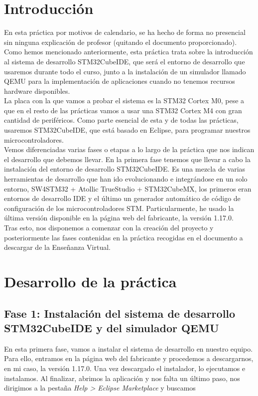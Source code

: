 \documentclass[11pt,a4paper]{article}
\begin{document}
	\section{Introducción}
	\large{
		En esta práctica por motivos de calendario, se ha hecho de forma no presencial sin ninguna explicación de profesor (quitando el documento proporcionado). Como hemos mencionado anteriormente, esta práctica trata sobre la introducción al sistema de desarrollo STM32CubeIDE, que será el entorno de desarrollo que usaremos durante todo el curso, junto a la instalación de un simulador llamado QEMU para la implementación de aplicaciones cuando no tenemos recursos hardware disponibles.\\

		La placa con la que vamos a probar el sistema es la STM32 Cortex M0, pese a que en el resto de las prácticas vamos a usar una STM32 Cortex M4 con gran cantidad de periféricos. Como parte esencial de esta y de todas las prácticas, usaremos STM32CubeIDE, que está basado en Eclipse, para programar nuestros microcontroladores.\\
		
		Vemos diferenciadas varias fases o etapas a lo largo de la práctica que nos indican el desarrollo que debemos llevar. En la primera fase tenemos que llevar a cabo la instalación del entorno de desarrollo STM32CubeIDE. Es una mezcla de varias herramientas de desarrollo que han ido evolucionando e integrándose
		en un solo entorno, SW4STM32 + Atollic TrueStudio + STM32CubeMX, los primeros eran entornos de desarrollo IDE
		y el último un generador automático de código de configuración de los microcontroladores STM. Particularmente, he usado la última versión disponible en la página web del fabricante, la versión 1.17.0.\\

		Tras esto, nos disponemos a comenzar con la creación del proyecto y posteriormente las fases contenidas en la práctica recogidas en el documento a descargar de la Enseñanza Virtual.
	}
	
	\section{Desarrollo de la práctica}
	\subsection{Fase 1: Instalación del sistema de desarrollo STM32CubeIDE y del simulador QEMU}
	En esta primera fase, vamos a instalar el sistema de desarrollo en nuestro equipo. Para ello, entramos en la página web del fabricante y procedemos a descargarnos, en mi caso, la versión 1.17.0. Una vez descargado el instalador, lo ejecutamos e instalamos. Al finalizar, abrimos la aplicación y nos falta un último paso, nos dirigimos a la pestaña \textit{Help > Eclipse Marketplace} y buscamos 
	
\end{document}
